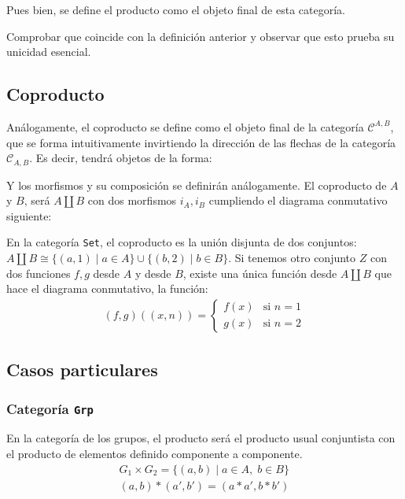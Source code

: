 \documentclass[11pt, fleqn, spanish]{book}
\newcommand{\C}{\mathcal{C} }
\newcommand{\twopartdef}[4]
{
  \left\{
    \begin{array}{ll}
      #1 & \mbox{si } #2 \\
      #3 & \mbox{si } #4
    \end{array}
  \right.
}
\begin{document}
    Pues bien, se define el producto como el objeto final de esta categoría.
    \begin{exercise} 
      Comprobar que coincide con la definición anterior y observar que esto
      prueba su unicidad esencial.
    \end{exercise}
    
  \subsection{Coproducto}
    Análogamente, el coproducto se define como el objeto final de la categoría $\C^{A,B}$,
    que se forma intuitivamente invirtiendo la dirección de las flechas de la categoría $\C_{A,B}$.
    Es decir, tendrá objetos de la forma:
    \begin{center}
    \end{center}
    Y los morfismos y su composición se definirán análogamente.
    El coproducto de $A$ y $B$, será $A \amalg B$ con dos morfismos $i_A,i_B$ cumpliendo
    el diagrama conmutativo siguiente:
    \begin{center}
    \end{center}
    
    \begin{example} 
      En la categoría \texttt{Set}, el coproducto es la unión disjunta de dos conjuntos: 
      $A \amalg B \cong \{(a,1) \; | \; a \in A\} \cup \{(b,2) \; | \; b \in B \}$. Si tenemos otro conjunto $Z$
      con dos funciones $f,g$ desde $A$ y desde $B$, existe una única función desde $A \amalg B$
      que hace el diagrama conmutativo, la función:
      \begin{gather*}
      (f,g)((x,n)) = \twopartdef{f(x)}{n = 1}{g(x)}{n = 2}
      \end{gather*}
    \end{example}


    
  \subsection{Casos particulares}
  \subsubsection{Categoría \texttt{Grp}}
    En la categoría de los grupos, el producto será el producto usual conjuntista con el
    producto de elementos definido componente a componente.
    \begin{align*}
     G_1 \times G_2 = \{(a,b)\; |\; a \in A,\; b \in B\} \\
     (a,b) \ast (a',b') = (a \ast a', b \ast b')
    \end{align*}
\end{document}
